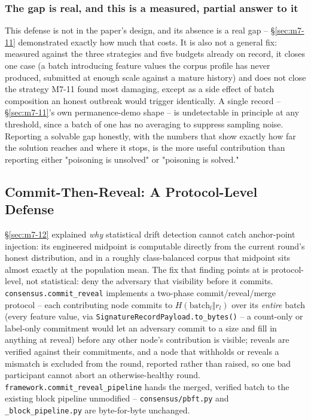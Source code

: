 \documentclass[conference]{IEEEtran}
\begin{document}
\subsubsection{The gap is real, and this is a measured, partial answer to it}

This defense is not in the paper's design, and its absence is a real gap -- \S\ref{sec:m7-11}
demonstrated exactly how much that costs. It is also not a general fix: measured against the
three strategies and five budgets already on record, it closes one case (a batch introducing
feature values the corpus profile has never produced, submitted at enough scale against a mature
history) and does not close the strategy M7-11 found most damaging, except as a side effect of
batch composition an honest outbreak would trigger identically. A single record -- \S\ref{sec:m7-11}'s
own permanence-demo shape -- is undetectable in principle at any threshold, since a batch of one
has no averaging to suppress sampling noise. Reporting a solvable gap honestly, with the numbers
that show exactly how far the solution reaches and where it stops, is the more useful contribution
than reporting either "poisoning is unsolved" or "poisoning is solved."

\subsection{Commit-Then-Reveal: A Protocol-Level Defense}
\label{sec:m7-14}

\S\ref{sec:m7-12} explained \emph{why} statistical drift detection cannot catch anchor-point
injection: its engineered midpoint is computable directly from the current round's honest
distribution, and in a roughly class-balanced corpus that midpoint sits almost exactly at the
population mean. The fix that finding points at is protocol-level, not statistical: deny the
adversary that visibility before it commits. \texttt{consensus.commit\_reveal} implements a
two-phase commit/reveal/merge protocol -- each contributing node commits to
$H(\mathrm{batch}_l \Vert r_l)$ over its \emph{entire} batch (every feature value, via
\texttt{SignatureRecordPayload.to\_bytes()} -- a count-only or label-only commitment would let an
adversary commit to a size and fill in anything at reveal) before any other node's contribution
is visible; reveals are verified against their commitments, and a node that withholds or reveals a
mismatch is excluded from the round, reported rather than raised, so one bad participant cannot
abort an otherwise-healthy round. \texttt{framework.commit\_reveal\_pipeline} hands the merged,
verified batch to the existing block pipeline unmodified -- \texttt{consensus/pbft.py} and
\texttt{\_block\_pipeline.py} are byte-for-byte unchanged.
\end{document}
